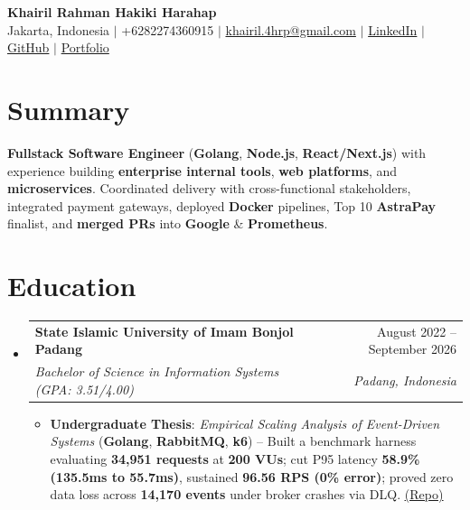 \documentclass[letterpaper,11pt]{article}
\makeatletter
\newcommand{\resumeItem}[1]{\item\small{#1}}
\newcommand{\resumeSubheading}[4]{
  \item
    \begin{tabular*}{\textwidth}[t]{l@{\extracolsep{\fill}}r}
      \textbf{#1} & #2 \\
      \textit{\small#3} & \textit{\small #4} \\
    \end{tabular*}\vspace{-1.8pt}
}
\newcommand{\resumeSubHeadingListStart}{\begin{itemize}[leftmargin=0in, label={}, itemsep=0.3pt, parsep=0pt, topsep=0.1pt]}
\newcommand{\resumeSubHeadingListEnd}{\end{itemize}\vspace{-2.5pt}}
\newcommand{\resumeItemListStart}{\begin{itemize}[leftmargin=15pt, label=\tiny$\bullet$, itemsep=0.35pt, parsep=0pt, topsep=0.15pt]}
\newcommand{\resumeItemListEnd}{\end{itemize}}
\makeatother
\begin{document}
\begin{center}\vspace*{-3pt}
    {\LARGE \bfseries Khairil Rahman Hakiki Harahap} \\[2pt]
    \footnotesize Jakarta, Indonesia $|$ +6282274360915 $|$ \href{mailto:khairil.4hrp@gmail.com}{khairil.4hrp@gmail.com} $|$ \href{https://linkedin.com/in/khairilrahman}{LinkedIn} $|$ \href{https://github.com/kyyril}{GitHub} $|$ \href{https://kiril.is-a.dev}{Portfolio}
\end{center}\vspace{-5pt}

\section{Summary}
  \small{\textbf{Fullstack Software Engineer} (\textbf{Golang}, \textbf{Node.js}, \textbf{React/Next.js}) with experience building \textbf{enterprise internal tools}, \textbf{web platforms}, and \textbf{microservices}. Coordinated delivery with cross-functional stakeholders, integrated payment gateways, deployed \textbf{Docker} pipelines, Top 10 \textbf{AstraPay} finalist, and \textbf{merged PRs} into \textbf{Google} \& \textbf{Prometheus}.}

\section{Education}
  \resumeSubHeadingListStart
    \resumeSubheading
      {State Islamic University of Imam Bonjol Padang}{August 2022 -- September 2026}
      {Bachelor of Science in Information Systems (GPA: 3.51/4.00)}{Padang, Indonesia}
      \resumeItemListStart
        \resumeItem{\textbf{Undergraduate Thesis}: \emph{Empirical Scaling Analysis of Event-Driven Systems} (\textbf{Golang}, \textbf{RabbitMQ}, \textbf{k6}) -- Built a benchmark harness evaluating \textbf{34,951 requests} at \textbf{200 VUs}; cut P95 latency \textbf{58.9\% (135.5ms to 55.7ms)}, sustained \textbf{96.56 RPS (0\% error)}; proved zero data loss across \textbf{14,170 events} under broker crashes via DLQ. \href{https://repository.uinib.ac.id/34986/}{\underline{(Repo)}}}
      \resumeItemListEnd
  \resumeSubHeadingListEnd

\end{document}
